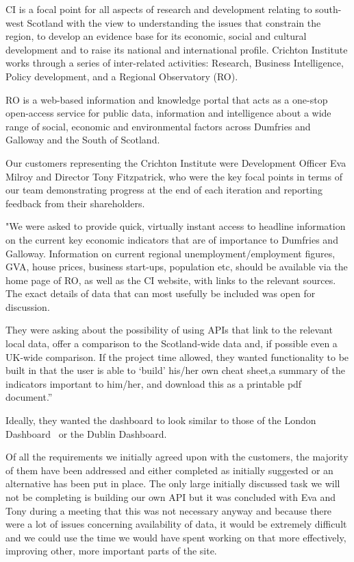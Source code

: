 \documentclass{l3proj}
\begin{document}
CI is a focal point for all aspects of research and development relating to south-west Scotland with the view to understanding the
issues that constrain the region, to develop an evidence base for its economic, social and cultural development and to raise its
national and international profile. Crichton Institute works through a series of inter-related activities: Research,
Business Intelligence, Policy development, and a Regional Observatory (RO).

RO is a web-based information and knowledge portal that acts as a one-stop open-access service for public data, information and
intelligence about a wide range of social, economic and environmental factors across Dumfries and Galloway and the South of Scotland.

Our customers representing the Crichton Institute were Development Officer Eva Milroy and Director Tony Fitzpatrick, who were the key
focal points in terms of our team demonstrating progress at the end of each iteration and reporting feedback from their shareholders.


"We were asked to provide quick, virtually instant access to headline information on the current key economic indicators that are of
importance to Dumfries and Galloway. Information on current regional unemployment/employment figures, GVA, house prices, business start-ups,
population etc, should be available via the home page of RO, as well as the CI website, with links to the relevant sources.
The exact details of data that can most usefully be included was open for discussion.

They were asking about the possibility of using APIs that link to the relevant local data, offer a comparison to the Scotland-wide data and,
if possible even a UK-wide comparison. If the project time allowed, they wanted functionality to be built in that the user is able to ‘build’ his/her
own cheat sheet,a summary of the indicators important to him/her, and download this as a printable pdf document.''

Ideally, they wanted the dashboard to look similar to those of the London Dashboard~\cite{LondonDashboard} or the Dublin Dashboard\cite{DublinDashboard}.


Of all the requirements we initially agreed upon with the customers, the majority of them have been addressed and either completed as initially suggested
or an alternative has been put in place. The only large initially discussed task we will not be completing is building our own API but it was concluded
with Eva and Tony during a meeting that this was not necessary anyway and because there were a lot of issues concerning availability of data, it would be
extremely difficult and we could use the time we would have spent working on that more effectively, improving other, more important parts of the site.
\end{document}
